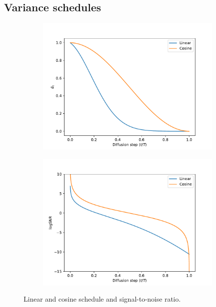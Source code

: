 \subsection{Variance schedules}
\begin{figure}[H]
    \centering
    \begin{subfigure}[b]{0.49\linewidth}
        \centering
        \includegraphics[width=\linewidth]{figures/schedule.pdf}    
    \end{subfigure}
    \hfill
    \begin{subfigure}[b]{0.49\linewidth}
        \centering
        \includegraphics[width=\linewidth]{figures/snr.pdf}    
    \end{subfigure}
    \caption{Linear and cosine schedule and signal-to-noise ratio.}
    \label{fig:schedule}
\end{figure}
